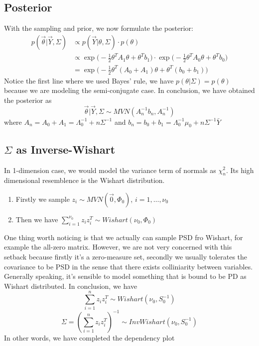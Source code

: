 \subsection*{Posterior}
With the sampling and prior, we now formulate the posterior:
\begin{align*}
    p(\vec{\theta} | \vec{Y}, \Sigma) &\propto p(\vec{Y} | \theta, \Sigma) \cdot p(\theta) \\
    &\propto \exp \big( -\frac{1}{2}\theta^TA_1\theta + \theta^Tb_1 \big) \cdot \exp \big( -\frac{1}{2}\theta^TA_0\theta + \theta^Tb_0 \big) \\
    &= \exp \big( -\frac{1}{2}\theta^T(A_0 + A_1)\theta + \theta^T(b_0 + b_1) \big)
\end{align*}
Notice the first line where we used Bayes' rule, we have $p(\theta | \Sigma) = p(\theta)$ because we are modeling the semi-conjugate case. In conclusion, we have obtained the posterior as
\begin{equation*}
    \vec{\theta} | \vec{Y}, \Sigma \sim MVN(A_n^{-1}b_n, A_n^{-1})
\end{equation*}
where $A_n = A_0 + A_1 = \Lambda_0^{-1} + n\Sigma^{-1}$ and $b_n = b_0 + b_1 = \Lambda_0^{-1}\mu_0 + n\Sigma^{-1}\bar{Y}$

\subsection{$\Sigma$ as Inverse-Wishart}
In 1-dimension case, we would model the variance term of normals as $\chi^2_n$. Its high dimensional resemblence is the Wishart distribution. 
\begin{enumerate}
    \item Firstly we sample $z_i \sim MVN(\vec{0}, \Phi_0)$, $i=1, \ldots, \nu_0$
    \item Then we have $\sum_{i=1}^{\nu_0}z_iz_i^T \sim Wishart(\nu_0, \Phi_0)$ 
\end{enumerate}
One thing worth noticing is that we actually can sample PSD fro Wishart, for example the all-zero matrix. However, we are not very concerned with this setback because firstly it's a zero-measure set, secondly we usually tolerates the covariance to be PSD in the sense that there exists colliniarity between variables. Generally speaking, it's sensible to model something that is bound to be PD as Wishart distributed. In conclusion, we have
\begin{equation*}
    \sum_{i=1}^{n}z_iz_i^T \sim Wishart(\nu_0, S_0^{-1})
\end{equation*}
\begin{equation*}
    \Sigma = (\sum_{i=1}^{n}z_iz_i^T)^{-1} \sim InvWishart(\nu_0, S_0^{-1})
\end{equation*}
In other words, we have completed the dependency plot

